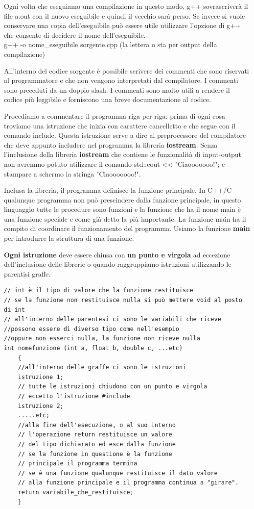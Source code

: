 \documentclass[11pt,fleqn]{book} %
\begin{document}
Ogni volta che eseguiamo una compilazione in questo modo, g++ sovrascriverà il file a.out con il nuovo eseguibile e quindi il vecchio sarà perso. Se invece si vuole conservare una copia dell'eseguibile può essere utile utilizzare l'opzione di g++ che consente di decidere il nome dell'eseguibile.\\
g++ -o nome\_eseguibile sorgente.cpp (la lettera o sta per output della compilazione) 


All'interno del codice sorgente è possibile scrivere dei commenti che sono riservati al programmatore e che non vengono interpretati dal compilatore. I commenti sono preceduti da un doppio slash. I commenti sono molto utili a rendere il codice più leggibile e forniscono una breve documentazione al codice.  

Procediamo a commentare il programma riga per riga:
prima di ogni cosa troviamo una istruzione che inizia con carattere cancelletto e che segue con il comando include. Questa istruzione serve a dire al preprocessore del compilatore che deve appunto includere nel programma la libreria \textbf{iostream}. Senza l'inclusione della libreria \textbf{iostream} che contiene le funzionalità di input-output non avremmo potuto utilizzare il comando std::cout << "Ciaooooooo!"; e stampare a schermo la stringa "Ciaooooooo!".

Inclusa la libreria, il programma definisce la funzione principale. In C++/C qualunque programma non può prescindere dalla funzione principale, in questo linguaggio tutte le procedure sono funzioni e la funzione che ha il nome main è una funzione speciale e come già detto la più importante. La funzione main ha il compito di coordinare il funzionamento del programma. 
Usiamo la funzione \textbf{main} per introdurre la struttura di una funzione.

\textbf{Ogni istruzione} deve essere chiusa con \textbf{un punto e virgola} ad eccezione dell'inclusione delle librerie o quando raggruppiamo istruzioni utilizzando le parentisi graffe.

\begin{verbatim}
// int è il tipo di valore che la funzione restituisce
// se la funzione non restituisce nulla si può mettere void al posto di int
// all'interno delle parentesi ci sono le variabili che riceve
//possono essere di diverso tipo come nell'esempio
//oppure non esserci nulla, la funzione non riceve nulla
int nomefunzione (int a, float b, double c, ...etc) 
	{
	//all'interno delle graffe ci sono le istruzioni
	istruzione 1;
	// tutte le istruzioni chiudono con un punto e virgola
	// eccetto l'istruzione #include
	istruzione 2;
	.....etc;
	//alla fine dell'esecuzione, o al suo interno
	// l'operazione return restituisce un valore
	// del tipo dichiarato ed esce dalla funzione
	// se la funzione in questione è la funzione
	// principale il programma termina
	// se è una funzione qualunque restituisce il dato valore
	// alla funzione principale e il programma continua a "girare".
	return variabile_che_restituisce;
	} 
\end{verbatim}
\end{document}
